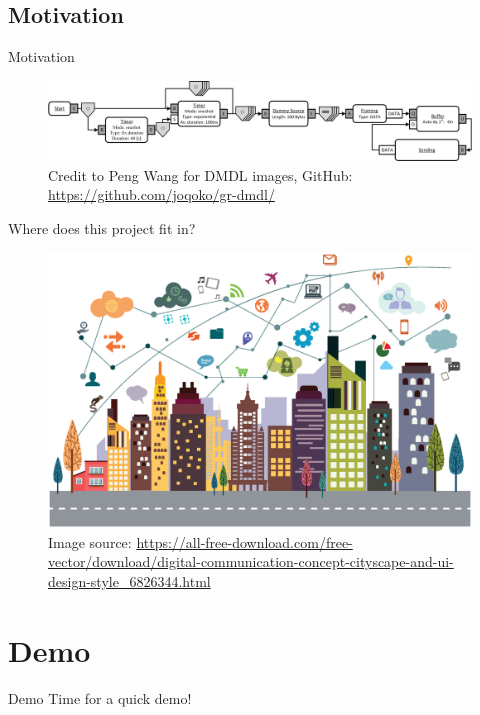 \documentclass{beamer}
\begin{document}
\subsection{Motivation}
\begin{frame}{Motivation}
	\begin{figure}
 		\includegraphics[width=\linewidth]{pure_aloha.png}
 		\label{fig:aloha}
        \vfill
        \vfill
        \center
        \begingroup
            \fontsize{3pt}{3pt}\selectfont
            \center
            Credit to Peng Wang for DMDL images, GitHub: \url{https://github.com/joqoko/gr-dmdl/}
        \endgroup
	\end{figure}
\end{frame}

\begin{frame}{Where does this project fit in?}
    \begin{figure}
	\includegraphics[width=0.74\linewidth]{digital.eps}
    \center
        \begingroup
            \fontsize{3pt}{3pt}\selectfont
            \center
            Image source: \url{https://all-free-download.com/free-vector/download/digital-communication-concept-cityscape-and-ui-design-style_6826344.html}
        \endgroup
    \end{figure}
\end{frame}

\section{Demo}
\begin{frame}{Demo}
Time for a quick demo!
\end{frame}
\end{document}
